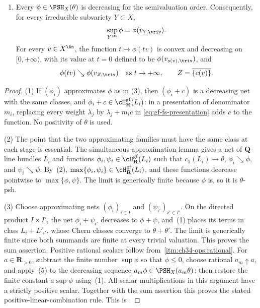 \begin{theorem}
\begin{enumerate}
      values.
\item\label{itm:bj-closure:radial} Every $\phi\in\PSH_X(\theta)$ is
      decreasing for the semivaluation order.  Consequently, for every
      irreducible subvariety $Y\subset X$,
      \[
       \sup_{Y^{\An}}\phi=\phi(v_{Y,\triv}).
      \]
      For every $v\in X^{\An}$, the function
      $t\mapsto\phi(tv)$ is convex and decreasing on
      $[0,+\infty)$, with its value at $t=0$ defined to be
      $\phi(v_{s(v),\triv})$, and
      \[
       \phi(tv)\searrow\phi(v_{Z,\triv})
       \quad\text{as }t\to+\infty,
       \qquad Z=\overline{\{c(v)\}}.
      \]
\end{enumerate}
\end{theorem}

\begin{proof}
(1) If $(\phi_i)$ approximates $\phi$ as in (3), then
$(\phi_i+c)$ is a decreasing net with the same classes, and
$\phi_i+c\in\cH^{\mathrm{gf}}_{\mathbf R}(L_i)$: in a presentation of
denominator $m_i$, replacing every weight $\lambda_j$ by
$\lambda_j+m_i c$ in \eqref{eq:gf-fs-presentation} adds $c$ to the
function.  No positivity of $\theta$ is used.

(2) The point that the two approximating families must have the same class
at each stage is essential.  The simultaneous approximation lemma
\cite[Lemma~4.9]{BJ22} gives a net of $\mathbf Q$-line bundles $L_i$ and
functions
$\phi_i,\psi_i\in\cH^{\mathrm{gf}}_{\mathbf R}(L_i)$ such that
$c_1(L_i)\to\theta$, $\phi_i\searrow\phi$, and
$\psi_i\searrow\psi$.  By
\,(2),
$\max\{\phi_i,\psi_i\}\in
\cH^{\mathrm{gf}}_{\mathbf R}(L_i)$, and these functions decrease
pointwise to $\max\{\phi,\psi\}$.  The limit is generically finite
because $\phi$ is, so it is $\theta$-psh.

(3) Choose approximating nets $(\phi_i)_{i\in I}$ and
$(\psi_{i'})_{i'\in I'}$.  On the directed product $I\times I'$, the
net $\phi_i+\psi_{i'}$ decreases to $\phi+\psi$, and
\,(1) places its terms in class
$L_i+L'_{i'}$, whose Chern classes converge to $\theta+\theta'$.
The limit is generically finite since both summands are finite at every
trivial valuation.  This proves the sum assertion.  Positive rational
scalars follow from
\,\cref{itm:ch34-ops:rational}.  For
$a\in\mathbf R_{>0}$, subtract the finite number $\sup\phi$ so that
$\phi\leq0$, choose rational $a_m\uparrow a$, and apply~(5) to the
decreasing sequence $a_m\phi\in\PSH_X(a_m\theta)$; then restore the
finite constant $a\sup\phi$ using~(1).  All scalar multiplications in
this argument have a strictly positive scalar.  Together with the sum
assertion this proves the stated positive-linear-combination rule.  This is
\cite[Theorem~4.7\,(i)--(ii)]{BJ22}.


\end{proof}
